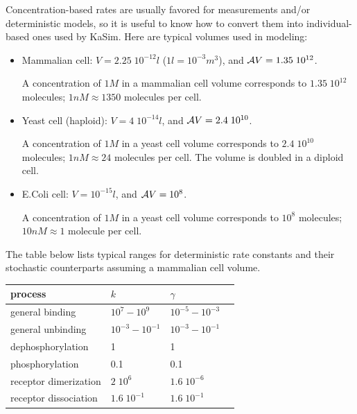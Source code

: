 \documentclass[11pt]{book}
\begin{document}
Concentration-based rates are usually favored for measurements and/or deterministic models, so it is useful to know how to convert them into
individual-based ones used by KaSim. 
Here are typical volumes used in modeling:
\begin{itemize}
\item
Mammalian cell: $V=2.25\; 10^{-12}l$  ($1l=10^{-3}m^3$), and ${\cal A}V=1.35\; 10^{12}$. 

A concentration of $1M$ in a mammalian cell volume corresponds to $1.35\; 10^{12}$ molecules; $1nM\approx 1350$ molecules per cell.
\item
Yeast cell (haploid): $V=4\; 10^{-14}l$, and ${\cal A}V=2.4\; 10^{10}$. 

A concentration of $1M$ in a yeast cell volume corresponds to $2.4\; 10^{10}$ molecules; $1nM\approx 24$ molecules per cell. The volume is doubled in a diploid cell.
\item
E.\@ Coli cell: $V=10^{-15}l$, and ${\cal A}V=10^{8}$. 

A concentration of $1M$ in a yeast cell volume corresponds to $10^{8}$ molecules; $10nM\approx 1$ molecule per cell.
\end{itemize}

The table below lists typical ranges for deterministic rate constants and 
their stochastic counterparts assuming a mammalian cell volume.

\begin{table}[htbp]
\centering
\begin{tabular}{@{} lllr @{} }
\toprule
process & $k$ & $\gamma$ %
\\
\midrule
general binding & $10^{7}-10^{9}$ & $10^{-5}-10^{-3}$ %
\\
general unbinding &  $10^{-3} - 10^{-1}$ & $10^{-3}-10^{-1}$ %
\\
dephosphorylation & 1 & 1 %
\\
phosphorylation & 0.1 & 0.1 %
\\
receptor dimerization & $2\; 10^{6}$ & $1.6 \;10^{-6}$ %
\\
receptor dissociation & $1.6\; 10^{-1}$ & $1.6\; 10^{-1}$ %
\\
\bottomrule
\end{tabular}
\end{table}
\end{document}
